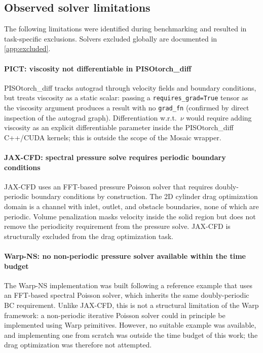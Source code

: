 \documentclass[11pt,a4paper]{article}
\begin{document}
\subsection{Observed solver limitations}
\label{app:solver-issues}

The following limitations were identified during benchmarking and resulted
in task-specific exclusions. Solvers excluded globally are documented in
\cref{app:excluded}.

\paragraph{PICT: viscosity not differentiable in PISOtorch\_diff}
PISOtorch\_diff tracks autograd through velocity fields and boundary
conditions, but treats viscosity as a static scalar: passing a
\texttt{requires\_grad=True} tensor as the viscosity argument produces a
result with no \texttt{grad\_fn} (confirmed by direct inspection of the
autograd graph). Differentiation w.r.t.\ $\nu$ would require adding
viscosity as an explicit differentiable parameter inside the PISOtorch\_diff
C++/CUDA kernels; this is outside the scope of the Mosaic wrapper.

\paragraph{JAX-CFD: spectral pressure solve requires periodic boundary conditions}
JAX-CFD uses an FFT-based pressure Poisson solver that requires doubly-periodic
boundary conditions by construction. The 2D cylinder drag optimization
domain is a channel with inlet, outlet, and obstacle boundaries, none of
which are periodic. Volume penalization masks velocity inside the solid
region but does not remove the periodicity requirement from the pressure
solve. JAX-CFD is structurally excluded from the drag optimization task.

\paragraph{Warp-NS: no non-periodic pressure solver available within the time budget}
The Warp-NS implementation was built following a reference example that uses an
FFT-based spectral Poisson solver, which inherits the same doubly-periodic BC
requirement. Unlike JAX-CFD, this is not a structural limitation of the Warp
framework: a non-periodic iterative Poisson solver could in principle be
implemented using Warp primitives. However, no suitable example was available,
and implementing one from scratch was outside the time budget of this work;
the drag optimization was therefore not attempted.
\end{document}
